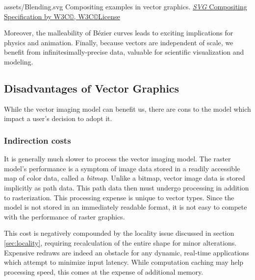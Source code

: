 \widesvg
{assets/Blending.svg}
{\label{fig:compositing}Compositing examples in vector graphics.}
{\href{https://dev.w3.org/SVG/modules/compositing/master/Overview.html}{\textit{SVG} Compositing Specification by W3C\copyright, \href{https://www.w3.org/Consortium/Legal/2015/copyright-software-and-document}{W3C\copyright License}}}\medskip

Moreover, the malleability of Bézier curves leads to exciting implications for physics and animation. Finally, because vectors are independent of scale, we benefit from infinitesimally-precise data, valuable for scientific visualization and modeling.

\subsection{Disadvantages of Vector Graphics}
While the vector imaging model can benefit us, there are cons to the model which impact a user's decision to adopt it.

\subsubsection{Indirection costs}
It is generally much slower to process the vector imaging model. The raster model's performance is a symptom of image data stored in a readily accessible map of color data, called a \textit{bitmap}. Unlike a bitmap, vector image data is stored implicitly as path data. This path data then must undergo processing in addition to rasterization. This processing expense is unique to vector types. Since the model is not stored in an immediately readable format, it is not easy to compete with the performance of raster graphics.\medskip

This cost is negatively compounded by the locality issue discussed in section \cref{sec:locality}, requiring recalculation of the entire shape for minor alterations. Expensive redraws are indeed an obstacle for any dynamic, real-time applications which attempt to minimize input latency. While computation caching may help processing speed, this comes at the expense of additional memory.

